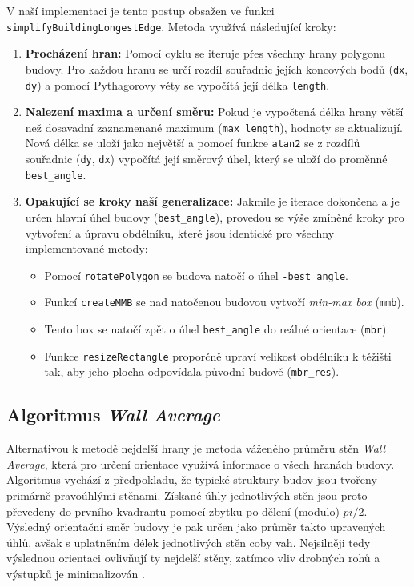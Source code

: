 \documentclass[12pt, a4paper]{article}
\begin{document}
V naší implementaci je tento postup obsažen ve funkci \texttt{simplifyBuildingLongestEdge}. Metoda využívá následující kroky:

\begin{enumerate}
    \item \textbf{Procházení hran:} Pomocí cyklu se iteruje přes všechny hrany polygonu budovy. Pro každou hranu se určí rozdíl souřadnic jejích koncových bodů (\texttt{dx}, \texttt{dy}) a pomocí Pythagorovy věty se vypočítá její délka \texttt{length}.
    \item \textbf{Nalezení maxima a určení směru:} Pokud je vypočtená délka hrany větší než dosavadní zaznamenané maximum (\texttt{max\_length}), hodnoty se aktualizují. Nová délka se uloží jako největší a pomocí funkce \texttt{atan2} se z rozdílů souřadnic (\texttt{dy}, \texttt{dx}) vypočítá její směrový úhel, který se uloží do proměnné \texttt{best\_angle}.
    \item \textbf{Opakující se kroky naší generalizace:} Jakmile je iterace dokončena a je určen hlavní úhel budovy (\texttt{best\_angle}), provedou se výše zmíněné kroky pro vytvoření a úpravu obdélníku, které jsou identické pro všechny implementované metody:
    \begin{itemize}
        \item Pomocí \texttt{rotatePolygon} se budova natočí o úhel \texttt{-best\_angle}.
        \item Funkcí \texttt{createMMB} se nad natočenou budovou vytvoří \textit{min-max box} (\texttt{mmb}).
        \item Tento box se natočí zpět o úhel \texttt{best\_angle} do reálné orientace (\texttt{mbr}).
        \item Funkce \texttt{resizeRectangle} proporčně upraví velikost obdélníku k těžišti tak, aby jeho plocha odpovídala původní budově (\texttt{mbr\_res}).
    \end{itemize}
\end{enumerate}


\subsection{Algoritmus \textit{Wall Average}}
Alternativou k metodě nejdelší hrany je metoda váženého průměru stěn \textit{Wall Average}, která pro určení orientace využívá informace o všech hranách budovy. Algoritmus vychází z předpokladu, že typické struktury budov jsou tvořeny primárně pravoúhlými stěnami. Získané úhly jednotlivých stěn jsou proto převedeny do prvního kvadrantu pomocí zbytku po dělení (modulo) $pi/2$. Výsledný orientační směr budovy je pak určen jako průměr takto upravených úhlů, avšak s uplatněním délek jednotlivých stěn coby vah. Nejsilněji tedy výslednou orientaci ovlivňují ty nejdelší stěny, zatímco vliv drobných rohů a výstupků je minimalizován \parencite{bayer}.
\end{document}
